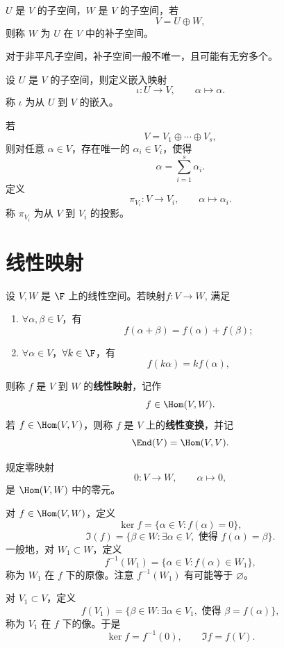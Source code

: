 \begin{definition}\label{p1:concept:c4-l1313}
	$U$ 是 $V$ 的子空间，$W$ 是 $V$ 的子空间，若
	\[
	V=U\oplus W,
	\]
	则称 $W$ 为 $U$ 在 $V$ 中的补子空间。
\end{definition}

对于非平凡子空间，补子空间一般不唯一，且可能有无穷多个。

\begin{definition}\label{p1:concept:c4-l1323}
	设 $U$ 是 $V$ 的子空间，则定义嵌入映射
	\[
	\iota:U\longrightarrow V,
	\qquad
	\alpha\longmapsto \alpha.
	\]
	称 $\iota$ 为从 $U$ 到 $V$ 的嵌入。
	
	若
	\[
	V=V_1\oplus\cdots\oplus V_s,
	\]
	则对任意 $\alpha\in V$，存在唯一的 $\alpha_i\in V_i$，使得
	\[
	\alpha=\sum_{i=1}^{s}\alpha_i.
	\]
	定义
	\[
	\pi_{V_i}:V\longrightarrow V_i,
	\qquad
	\alpha\longmapsto \alpha_i.
	\]
	称 $\pi_{V_i}$ 为从 $V$ 到 $V_i$ 的投影。
\end{definition}
\section{线性映射}
\begin{definition}\label{p1:concept:c4-l1349}
	设 $V,W$ 是 $\F$ 上的线性空间。若映射$f:V\longrightarrow W$,
	满足
	\begin{enumerate}
		\item $\forall \alpha,\beta\in V$，有
		\[
		f(\alpha+\beta)=f(\alpha)+f(\beta);
		\]
		\item $\forall \alpha\in V$，$\forall k\in\F$，有
		\[
		f(k\alpha)=k f(\alpha),
		\]
	\end{enumerate}
	则称 $f$ 是 $V$ 到 $W$ 的\textbf{线性映射}，记作
	\[
	f\in\Hom(V,W).
	\]
	若 $f\in\Hom(V,V)$，则称 $f$ 是 $V$ 上的\textbf{线性变换}，并记
	\[
	\End(V)=\Hom(V,V).
	\]
\end{definition}

规定零映射
\[
0:V\longrightarrow W,
\qquad
\alpha\longmapsto 0,
\]
是 $\Hom(V,W)$ 中的零元。

对 $f\in\Hom(V,W)$，定义
\[
\ker f=\{\alpha\in V:f(\alpha)=0\},
\]
\[
\Im(f)=\{\beta\in W:\exists\alpha\in V,\text{ 使得 }f(\alpha)=\beta\}.
\]
一般地，对 $W_1\subset W$，定义
\[
f^{-1}(W_1)=\{\alpha\in V:f(\alpha)\in W_1\},
\]
\label{p1:concept:c4-l1391}称为 $W_1$ 在 $f$ 下的原像。注意 $f^{-1}(W_1)$ 有可能等于 $\varnothing$。

对 $V_1\subset V$，定义
\[
f(V_1)=\{\beta\in W:\exists\alpha\in V_1,\text{ 使得 }\beta=f(\alpha)\},
\]
\label{p1:concept:c4-l1397}称为 $V_1$ 在 $f$ 下的像。于是
\[
\ker f=f^{-1}(0),
\qquad
\Im f=f(V).
\]

